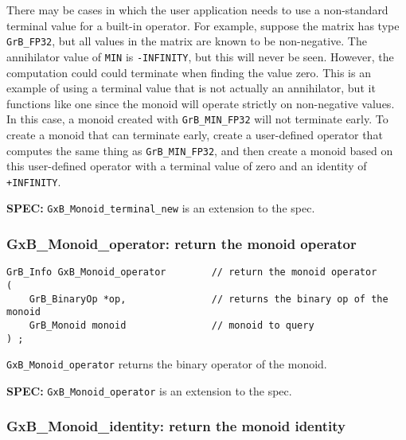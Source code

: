 \documentclass[12pt]{article}
\begin{document}
There may be cases in which the user application needs to use a non-standard
terminal value for a built-in operator.  For example, suppose the matrix has
type \verb'GrB_FP32', but all values in the matrix are known to be
non-negative.  The annihilator value of \verb'MIN' is \verb'-INFINITY', but
this will never be seen.  However, the computation could could terminate when
finding the value zero.  This is an example of using a terminal value that is
not actually an annihilator, but it functions like one since the monoid will
operate strictly on non-negative values.  In this case, a monoid created with
\verb'GrB_MIN_FP32' will not terminate early.  To create a monoid that can
terminate early, create a user-defined operator that computes the same thing as
\verb'GrB_MIN_FP32', and then create a monoid based on this user-defined
operator with a terminal value of zero and an identity of \verb'+INFINITY'.

\begin{spec}
{\bf SPEC:} \verb'GxB_Monoid_terminal_new' is an extension to the spec.
\end{spec}

\subsubsection{{\sf GxB\_Monoid\_operator:} return the monoid operator}
\label{monoid_operator}

\begin{mdframed}[userdefinedwidth=6in]
{\footnotesize
\begin{verbatim}
GrB_Info GxB_Monoid_operator        // return the monoid operator
(
    GrB_BinaryOp *op,               // returns the binary op of the monoid
    GrB_Monoid monoid               // monoid to query
) ;
\end{verbatim}
} \end{mdframed}

\verb'GxB_Monoid_operator' returns the binary operator of the monoid.

\begin{spec}
{\bf SPEC:} \verb'GxB_Monoid_operator' is an extension to the spec.
\end{spec}

\subsubsection{{\sf GxB\_Monoid\_identity:} return the monoid identity}
\end{document}
